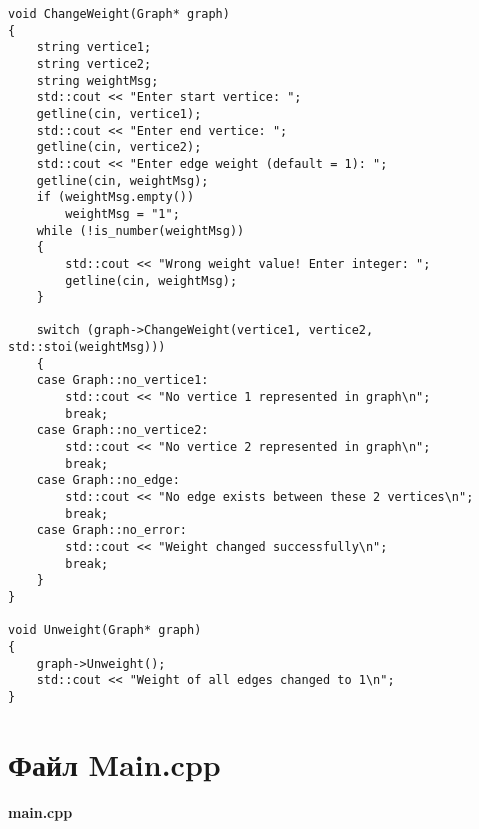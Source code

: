 \documentclass[otchet]{SCWorks}
\begin{document}
\begin{verbatim}
void ChangeWeight(Graph* graph)
{
	string vertice1;
	string vertice2;
	string weightMsg;
	std::cout << "Enter start vertice: ";
	getline(cin, vertice1);
	std::cout << "Enter end vertice: ";
	getline(cin, vertice2);
	std::cout << "Enter edge weight (default = 1): ";
	getline(cin, weightMsg);
	if (weightMsg.empty())
		weightMsg = "1";
	while (!is_number(weightMsg))
	{
		std::cout << "Wrong weight value! Enter integer: ";
		getline(cin, weightMsg);
	}

	switch (graph->ChangeWeight(vertice1, vertice2, std::stoi(weightMsg)))
	{
	case Graph::no_vertice1:
		std::cout << "No vertice 1 represented in graph\n";
		break;
	case Graph::no_vertice2:
		std::cout << "No vertice 2 represented in graph\n";
		break;
	case Graph::no_edge:
		std::cout << "No edge exists between these 2 vertices\n";
		break;
	case Graph::no_error:
		std::cout << "Weight changed successfully\n";
		break;
	}
}

void Unweight(Graph* graph)
{
	graph->Unweight();
	std::cout << "Weight of all edges changed to 1\n";
}
\end{verbatim}

\section{Файл Main.cpp}
\label{Main}

\textbf{main.cpp}
\end{document}
